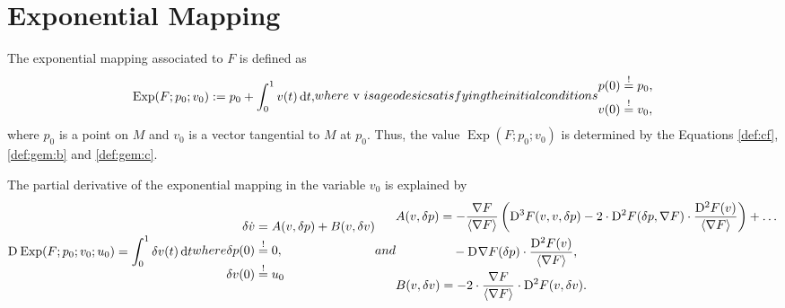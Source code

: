 \section{Exponential Mapping}

The exponential mapping associated to $ F $ is defined as
\begin{subequations}
    \label{def:gem}
    \begin{align}
        \label{def:gem:a}
        \operatorname{Exp}( F; p_0; v_0 )  :=
        p_0  +  \int^1_0 v( t ) \intd{ t } ,
    \end{align}
    where $ v $ is a geodesic satisfying the initial conditions
    \begin{align}
        p( 0 )  &\overset{ ! }{ = }   p_0 ,
        \label{def:gem:b}\\
        v( 0 )  &\overset{ ! }{ = }   v_0 ,
        \label{def:gem:c}
    \end{align}
\end{subequations}
where $ p_0 $ is a point on $ M $ and
$ v_0 $ is a vector tangential to $ M $ at $ p_0 $.
Thus, the value $ \operatorname{Exp}(F;p_0;v_0) $
is determined by the Equations \eqref{def:cf},
\eqref{def:gem:b} and \eqref{def:gem:c}.


The partial derivative of the exponential mapping
in the variable $ v_0 $ is explained by
\begin{subequations}
    \begin{align}
        \diff{}{ \operatorname{Exp} }( F; p_0; v_0; u_0 )  =
        \int^1_0 \delta v( t ) \intd{ t }
    \end{align}
    where
    \begin{align}
        \delta \dot{ v }   &=
        A( v, \delta p )  +  B( v, \delta v ) \\
        \delta p( 0 )  &\overset{ ! }{ = }  0,\\
        \delta v( 0 )  &\overset{ ! }{ = }  u_0
    \end{align}
    and
    \begin{align}
        &\begin{aligned}
            A( v, \delta p )   &=
            - \frac{ \grad{F} }{ \skaq{ \grad{F} } }
            \left(  \diff{3}{F}( v, v, \delta p )  -
            2 \mult \diff{2}{F}( \delta p, \grad{F} ) \mult
            \frac{ \diff{2}{F}( v ) }{ \skaq{\grad{F}} }  \right)  +  \dots\\
            &\hphantom{={}} - \diff{}{\grad{F}}( \delta p ) \mult
            \frac{ \diff{2}{F}( v ) }{ \skaq{\grad{F}} } ,
        \end{aligned} \\
        &B( v, \delta v )   =
        - 2 \mult \frac{ \grad{F} }{ \skaq{ \grad{F} } }  \mult
        \diff{2}{F}( v, \delta v ) .
    \end{align}
\end{subequations}



